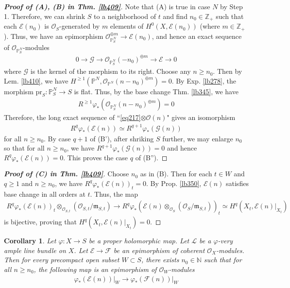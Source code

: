 \documentclass[12pt,b5paper,notitlepage]{report}
\theoremstyle{definition}
\theoremstyle{plain}
\newtheorem{co}[df]{Corollary}
\newcommand{\scr}{\mathscr}
\newcommand{\Nbb}{\mathbb N}
\newcommand{\Zbb}{\mathbb Z}
\newcommand{\Pbb}{\mathbb P}
\newcommand{\pr}{\mathrm {pr}}
\newcommand{\mk}{\mathfrak m}
\numberwithin{equation}{section}
\begin{document}
\begin{proof}[\textbf{Proof of (A), (B) in Thm. \ref{lb409}}]
 
Note that (A) is true in case $N$ by Step 1. Therefore, we can shrink $S$ to a neighborhood of $t$ and find $n_0\in\Zbb_+$ such that each  $\scr E(n_0)$ is $\scr O_S$-generated by $m$ elements of $H^0(X,\scr E(n_0))$ (where $m\in\Zbb_+$). Thus,  we have an epimorphism $\scr O_{\Pbb^N_S}^{\oplus m}\rightarrow \scr E(n_0)$, and hence an exact sequence of $\scr O_{\Pbb^N_S}$-modules
\begin{align}
0\rightarrow \scr G\rightarrow\scr O_{\Pbb^N_S}(-n_0)^{\oplus m}\rightarrow\scr E\rightarrow0   \label{eq217}
\end{align}
where $\scr G$ is the kernel of the morphism to its right. Choose any $n\geq n_0$. Then by Lem. \ref{lb410}, we have $H^{\geq1}(\Pbb^N,\scr O_{\Pbb^N}(n-n_0)^{\oplus m})=0$. By Exp. \ref{lb278}, the morphism $\pr_S:\Pbb^N_S\rightarrow S$ is flat. Thus, by the base change Thm. \ref{lb345}, we have
\begin{align*}
R^{\geq1}\varphi_*(\scr O_{\Pbb^N_S}(n-n_0)^{\oplus m})=0
\end{align*}
Therefore, the long exact sequence of ``\eqref{eq217}$\otimes\scr O(n)$" gives an isomorphism
\begin{align}
R^q\varphi_*(\scr E(n))\simeq R^{q+1}\varphi_*(\scr G(n))
\end{align}
for all $n\geq n_0$. By case $q+1$ of (B'), after shriking $S$ further, we may enlarge $n_0$ so that for all $n\geq n_0$, we have $R^{q+1}\varphi_*(\scr G(n))=0$ and hence $R^q\varphi_*(\scr E(n))=0$. This proves the case $q$ of (B''). 
\end{proof}




\begin{proof}[\textbf{Proof of (C) in Thm. \ref{lb409}}]
Choose $n_0$ as in (B). Then for each $t\in W$ and $q\geq 1$ and $n\geq n_0$, we have $R^q\varphi_*(\scr E(n))_t=0$. By Prop. \ref{lb350}, $\scr E(n)$ satisfies base change in all orders at $t$. Thus, the map
\begin{align*}
R^q\varphi_*(\scr E(n))_t\otimes_{\scr O_{S,t}}(\scr O_{S,t}/\mk_{S,t})\rightarrow R^q\varphi_*(\scr E(n)\otimes_{\scr O_S}(\scr O_S/\mk_{S,t}))_t\simeq H^q(X_t,\scr E(n)|_{X_t})
\end{align*}
is bijective, proving that $H^q(X_t,\scr E(n)|_{X_t})=0$.
\end{proof}



\begin{co}\label{lb411}
Let $\varphi:X\rightarrow S$ be a proper holomorphic map. Let $\scr L$ be a $\varphi$-very ample line bundle on $X$. Let $\scr E\rightarrow \scr F$ be an epimorphism of coherent $\scr O_X$-modules. Then for every precompact open subset $W\subset S$, there exists $n_0\in\Nbb$ such that for all $n\geq n_0$, the following map is an epimorphism of $\scr O_W$-modules
\begin{align*}
\varphi_*(\scr E(n))\big|_W\rightarrow \varphi_*(\scr F(n))\big|_W
\end{align*}
\end{co}
\end{document}
